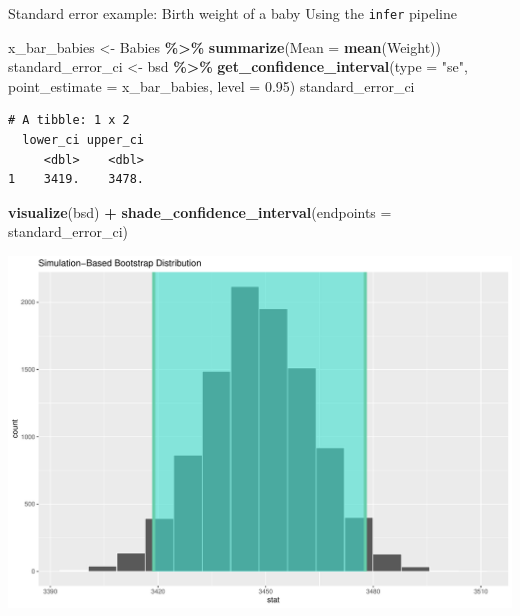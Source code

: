 \documentclass[
  ignorenonframetext,
]{beamer}
\newenvironment{Shaded}{\begin{snugshade}}{\end{snugshade}}
\newcommand{\AttributeTok}[1]{\textcolor[rgb]{0.13,0.29,0.53}{#1}}
\newcommand{\FloatTok}[1]{\textcolor[rgb]{0.00,0.00,0.81}{#1}}
\newcommand{\FunctionTok}[1]{\textcolor[rgb]{0.13,0.29,0.53}{\textbf{#1}}}
\newcommand{\NormalTok}[1]{#1}
\newcommand{\OtherTok}[1]{\textcolor[rgb]{0.56,0.35,0.01}{#1}}
\newcommand{\SpecialCharTok}[1]{\textcolor[rgb]{0.81,0.36,0.00}{\textbf{#1}}}
\newcommand{\StringTok}[1]{\textcolor[rgb]{0.31,0.60,0.02}{#1}}
\begin{document}
\begin{frame}[fragile]{Standard error example: Birth weight of a baby}
\protect\hypertarget{standard-error-example-birth-weight-of-a-baby}{}
Using the \texttt{infer} pipeline

\tiny

\begin{Shaded}
\begin{Highlighting}[]
\NormalTok{x\_bar\_babies }\OtherTok{\textless{}{-}}\NormalTok{ Babies }\SpecialCharTok{\%\textgreater{}\%} \FunctionTok{summarize}\NormalTok{(}\AttributeTok{Mean =} \FunctionTok{mean}\NormalTok{(Weight))}
\NormalTok{standard\_error\_ci }\OtherTok{\textless{}{-}}\NormalTok{ bsd }\SpecialCharTok{\%\textgreater{}\%} 
  \FunctionTok{get\_confidence\_interval}\NormalTok{(}\AttributeTok{type =} \StringTok{"se"}\NormalTok{, }\AttributeTok{point\_estimate =}\NormalTok{ x\_bar\_babies, }\AttributeTok{level =} \FloatTok{0.95}\NormalTok{)}
\NormalTok{standard\_error\_ci}
\end{Highlighting}
\end{Shaded}

\begin{verbatim}
# A tibble: 1 x 2
  lower_ci upper_ci
     <dbl>    <dbl>
1    3419.    3478.
\end{verbatim}

\begin{Shaded}
\begin{Highlighting}[]
\FunctionTok{visualize}\NormalTok{(bsd) }\SpecialCharTok{+} 
  \FunctionTok{shade\_confidence\_interval}\NormalTok{(}\AttributeTok{endpoints =}\NormalTok{ standard\_error\_ci)}
\end{Highlighting}
\end{Shaded}

\begin{center}\includegraphics[width=0.7\linewidth,height=0.4\textheight]{Week10A_files/figure-beamer/unnamed-chunk-19-1} \end{center}
\normalsize
\end{frame}
\end{document}
